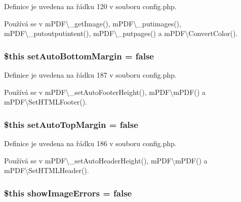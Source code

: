 Definice je uvedena na řádku 120 v souboru config.\-php.



Používá se v m\-P\-D\-F\textbackslash{}\-\_\-get\-Image(), m\-P\-D\-F\textbackslash{}\-\_\-putimages(), m\-P\-D\-F\textbackslash{}\-\_\-putoutputintent(), m\-P\-D\-F\textbackslash{}\-\_\-putpages() a m\-P\-D\-F\textbackslash{}\-Convert\-Color().

\hypertarget{config_8php_aa5ce0e4a17ae148ff2e65f361489c6e6}{
\subsubsection[{set\-Auto\-Bottom\-Margin}]{\setlength{\rightskip}{0pt plus 5cm}\$this set\-Auto\-Bottom\-Margin = {\bf false}}}\label{config_8php_aa5ce0e4a17ae148ff2e65f361489c6e6}


Definice je uvedena na řádku 187 v souboru config.\-php.



Používá se v m\-P\-D\-F\textbackslash{}\-\_\-set\-Auto\-Footer\-Height(), m\-P\-D\-F\textbackslash{}m\-P\-D\-F() a m\-P\-D\-F\textbackslash{}\-Set\-H\-T\-M\-L\-Footer().

\hypertarget{config_8php_abb6802e13edcab8d25add411772cbf4d}{
\subsubsection[{set\-Auto\-Top\-Margin}]{\setlength{\rightskip}{0pt plus 5cm}\$this set\-Auto\-Top\-Margin = {\bf false}}}\label{config_8php_abb6802e13edcab8d25add411772cbf4d}


Definice je uvedena na řádku 186 v souboru config.\-php.



Používá se v m\-P\-D\-F\textbackslash{}\-\_\-set\-Auto\-Header\-Height(), m\-P\-D\-F\textbackslash{}m\-P\-D\-F() a m\-P\-D\-F\textbackslash{}\-Set\-H\-T\-M\-L\-Header().

\hypertarget{config_8php_ab00a828b784d970d099dc46421761d7d}{
\subsubsection[{show\-Image\-Errors}]{\setlength{\rightskip}{0pt plus 5cm}\$this show\-Image\-Errors = {\bf false}}}\label{config_8php_ab00a828b784d970d099dc46421761d7d}


